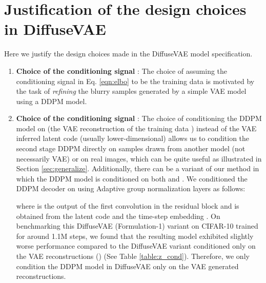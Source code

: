 \documentclass[10pt]{article} \usepackage[accepted]{tmlr}
\begin{document}
\section{Justification of the design choices in DiffuseVAE}
\label{app:appendix_d}
Here we justify the design choices made in the DiffuseVAE model specification.
\begin{enumerate}
    \item \textbf{Choice of the conditioning signal }: The choice of assuming the conditioning signal  in Eq. \ref{eqn:elbo} to be the training data  is motivated by the task of \textit{refining} the blurry samples generated by a simple VAE model using a DDPM model.
    
    \item \textbf{Choice of the conditioning signal }: The choice of conditioning the DDPM model on  (the VAE reconstruction of the training data ) instead of the VAE inferred latent code  (usually lower-dimensional) allows us to condition the second stage DDPM directly on samples drawn from another model (not necessarily VAE) or on real images, which can be quite useful as illustrated in Section \ref{sec:generalize}. Additionally, there can be a variant of our method in which the DDPM model is conditioned on both  and . We conditioned the DDPM decoder on  using Adaptive group normalization layers \citep{dhariwal2021diffusion, https://doi.org/10.48550/arxiv.1803.08494} as follows:
    
    
    where  is the output of the first convolution in the residual block and  is obtained from the latent code  and the time-step embedding .
    On benchmarking this DiffuseVAE (Formulation-1) variant on CIFAR-10 trained for around 1.1M steps, we found that the resulting model exhibited slightly worse performance compared to the DiffuseVAE variant conditioned only on the VAE reconstructions () (See Table \ref{table:z_cond}). Therefore, we only condition the DDPM model in DiffuseVAE only on the VAE generated reconstructions.


\end{enumerate}
\end{document}

